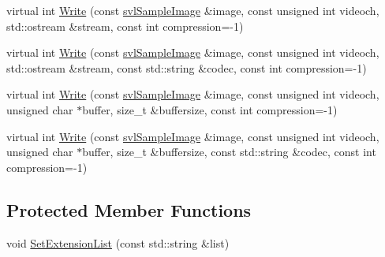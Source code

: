 \begin{DoxyCompactItemize}
\item 
virtual int \hyperlink{classsvl_image_codec_base_af73358b74777ced45092ef1718fca989}{Write} (const \hyperlink{classsvl_sample_image}{svl\-Sample\-Image} \&image, const unsigned int videoch, std\-::ostream \&stream, const int compression=-\/1)
\item 
virtual int \hyperlink{classsvl_image_codec_base_a710ff93e79de62bf7fce7010f3fbddfd}{Write} (const \hyperlink{classsvl_sample_image}{svl\-Sample\-Image} \&image, const unsigned int videoch, std\-::ostream \&stream, const std\-::string \&codec, const int compression=-\/1)
\item 
virtual int \hyperlink{classsvl_image_codec_base_a4c641974416dcb6905f1f54a087e60a9}{Write} (const \hyperlink{classsvl_sample_image}{svl\-Sample\-Image} \&image, const unsigned int videoch, unsigned char $\ast$buffer, size\-\_\-t \&buffersize, const int compression=-\/1)
\item 
virtual int \hyperlink{classsvl_image_codec_base_a32f578854e6bbc877755a56461c08d8e}{Write} (const \hyperlink{classsvl_sample_image}{svl\-Sample\-Image} \&image, const unsigned int videoch, unsigned char $\ast$buffer, size\-\_\-t \&buffersize, const std\-::string \&codec, const int compression=-\/1)
\end{DoxyCompactItemize}
\subsection*{Protected Member Functions}
\begin{DoxyCompactItemize}
\item 
void \hyperlink{classsvl_image_codec_base_aadaacb49380ea09455832e3d9bdba8de}{Set\-Extension\-List} (const std\-::string \&list)
\end{DoxyCompactItemize}


